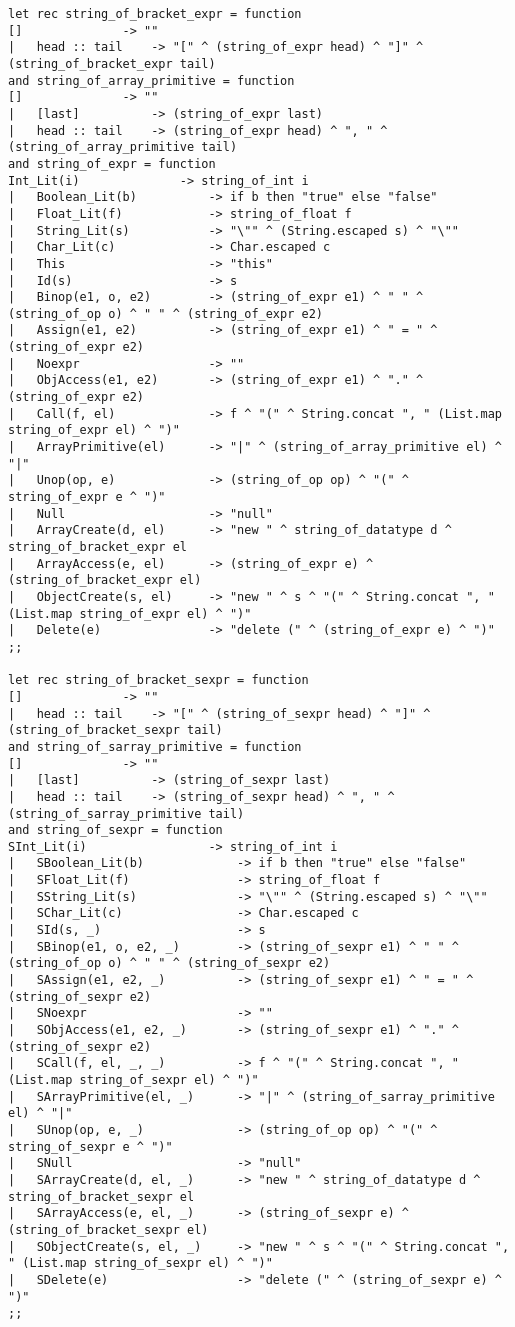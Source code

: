 \begin{verbatim}
let rec string_of_bracket_expr = function
[] 				-> ""
| 	head :: tail 	-> "[" ^ (string_of_expr head) ^ "]" ^ (string_of_bracket_expr tail)
and string_of_array_primitive = function
[] 				-> ""
|   [last]			-> (string_of_expr last)
| 	head :: tail 	-> (string_of_expr head) ^ ", " ^ (string_of_array_primitive tail)
and string_of_expr = function 
Int_Lit(i)				-> string_of_int i
|	Boolean_Lit(b)			-> if b then "true" else "false"
|	Float_Lit(f)			-> string_of_float f
|	String_Lit(s)			-> "\"" ^ (String.escaped s) ^ "\""
|	Char_Lit(c)				-> Char.escaped c
|	This					-> "this"
|	Id(s)					-> s
|	Binop(e1, o, e2)		-> (string_of_expr e1) ^ " " ^ (string_of_op o) ^ " " ^ (string_of_expr e2)
|	Assign(e1, e2)			-> (string_of_expr e1) ^ " = " ^ (string_of_expr e2)
|	Noexpr					-> ""
|	ObjAccess(e1, e2)		-> (string_of_expr e1) ^ "." ^ (string_of_expr e2)
|	Call(f, el)				-> f ^ "(" ^ String.concat ", " (List.map string_of_expr el) ^ ")"
|	ArrayPrimitive(el)		-> "|" ^ (string_of_array_primitive el) ^ "|"
|  	Unop(op, e)				-> (string_of_op op) ^ "(" ^ string_of_expr e ^ ")"
|	Null					-> "null"
|   ArrayCreate(d, el)  	-> "new " ^ string_of_datatype d ^ string_of_bracket_expr el
|   ArrayAccess(e, el)  	-> (string_of_expr e) ^ (string_of_bracket_expr el)
|   ObjectCreate(s, el) 	-> "new " ^ s ^ "(" ^ String.concat ", " (List.map string_of_expr el) ^ ")"
| 	Delete(e) 				-> "delete (" ^ (string_of_expr e) ^ ")"
;;

let rec string_of_bracket_sexpr = function
[] 				-> ""
| 	head :: tail 	-> "[" ^ (string_of_sexpr head) ^ "]" ^ (string_of_bracket_sexpr tail)
and string_of_sarray_primitive = function
[] 				-> ""
|   [last]			-> (string_of_sexpr last)
| 	head :: tail 	-> (string_of_sexpr head) ^ ", " ^ (string_of_sarray_primitive tail)
and string_of_sexpr = function 
SInt_Lit(i)					-> string_of_int i
|	SBoolean_Lit(b)				-> if b then "true" else "false"
|	SFloat_Lit(f)				-> string_of_float f
|	SString_Lit(s)				-> "\"" ^ (String.escaped s) ^ "\""
|	SChar_Lit(c)				-> Char.escaped c
|	SId(s, _)					-> s
|	SBinop(e1, o, e2, _)		-> (string_of_sexpr e1) ^ " " ^ (string_of_op o) ^ " " ^ (string_of_sexpr e2)
|	SAssign(e1, e2, _)			-> (string_of_sexpr e1) ^ " = " ^ (string_of_sexpr e2)
|	SNoexpr						-> ""
|	SObjAccess(e1, e2, _)		-> (string_of_sexpr e1) ^ "." ^ (string_of_sexpr e2)
|	SCall(f, el, _, _)			-> f ^ "(" ^ String.concat ", " (List.map string_of_sexpr el) ^ ")"
|	SArrayPrimitive(el, _)		-> "|" ^ (string_of_sarray_primitive el) ^ "|"
|  	SUnop(op, e, _)				-> (string_of_op op) ^ "(" ^ string_of_sexpr e ^ ")"
|	SNull						-> "null"
|   SArrayCreate(d, el, _)  	-> "new " ^ string_of_datatype d ^ string_of_bracket_sexpr el
|   SArrayAccess(e, el, _)  	-> (string_of_sexpr e) ^ (string_of_bracket_sexpr el)
|   SObjectCreate(s, el, _) 	-> "new " ^ s ^ "(" ^ String.concat ", " (List.map string_of_sexpr el) ^ ")"
| 	SDelete(e) 					-> "delete (" ^ (string_of_sexpr e) ^ ")"
;;


\end{verbatim}
